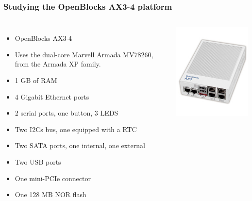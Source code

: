 \begin{frame}
  \frametitle{Studying the OpenBlocks AX3-4 platform}
  \begin{columns}
    \begin{itemize}
    \item OpenBlocks AX3-4
    \item Uses the dual-core Marvell Armada MV78260, from the Armada
      XP family.
    \item 1 GB of RAM
    \item 4 Gigabit Ethernet ports
    \item 2 serial ports, one button, 3 LEDS
    \item Two I2Cs bus, one equipped with a RTC
    \item Two SATA ports, one internal, one external
    \item Two USB ports
    \item One mini-PCIe connector
    \item One 128 MB NOR flash
    \end{itemize}
    \includegraphics[width=\textwidth]{slides/kernel-porting-content/openblocks.jpg}
  \end{columns}
\end{frame}

